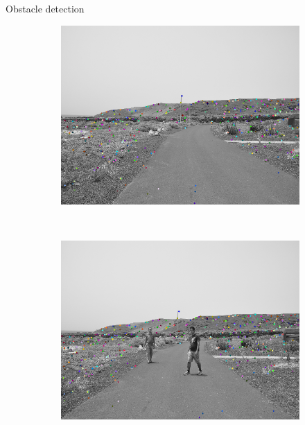 \begin{frame}{Obstacle detection}
  \begin{figure}[t]
	\centering
	\begin{subfigure}[b]{0.24\columnwidth}
	    \includegraphics[width=\textwidth]{pipeline/fig5}\label{fig:pipelineA_1}
	\end{subfigure}%
	~
	\begin{subfigure}[b]{0.24\columnwidth}
	    \includegraphics[width=\textwidth]{pipeline/fig4}\label{fig:pipelineA_2}
	\end{subfigure}%
	~
	\begin{subfigure}[b]{0.24\columnwidth}

\end{subfigure}
\end{figure}
\end{frame}
